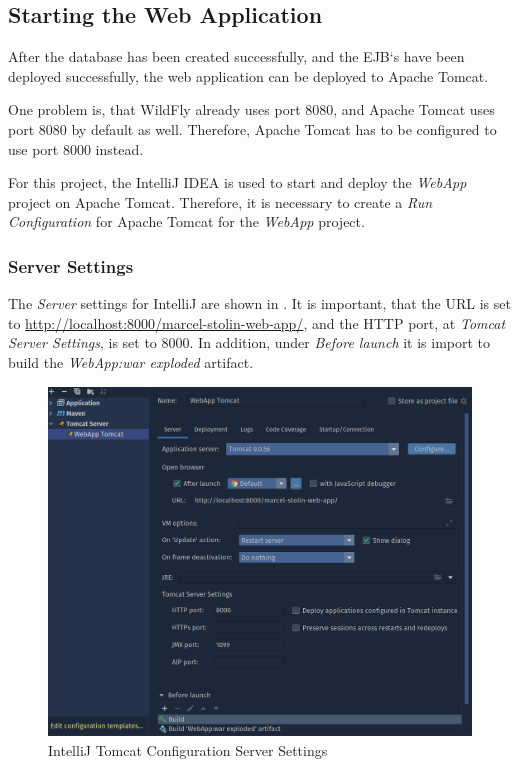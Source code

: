 \subsection{Starting the Web Application}\label{sec:03_depl_webapp}
After the database has been created successfully, and the EJB`s have been deployed successfully, the web application can be deployed to Apache Tomcat.

One problem is, that WildFly already uses port 8080, and Apache Tomcat uses port 8080 by default as well. Therefore, Apache Tomcat has to be configured to use port 8000 instead. 

For this project, the IntelliJ IDEA is used to start and deploy the \textit{WebApp} project on Apache Tomcat. Therefore, it is necessary to create a \textit{Run Configuration} for Apache Tomcat for the \textit{WebApp} project.

\subsubsection{Server Settings}
The \textit{Server} settings for IntelliJ are shown in . It is important, that the URL is set to \url{http://localhost:8000/marcel-stolin-web-app/}, and the HTTP port, at \textit{Tomcat Server Settings},  is set to 8000. In addition, under \textit{Before launch} it is import to build the \textit{WebApp:war exploded} artifact.
\begin{figure}[h]
\centering
\includegraphics[scale=0.2]{images/03_depl/tomcat-config-1}
\caption{IntelliJ Tomcat Configuration Server Settings}
\label{fig:03_depl_webapp_intellij_config1}
\end{figure}

